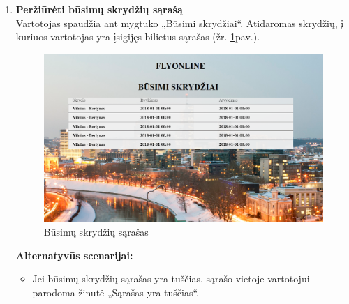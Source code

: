 \documentclass{VUMIFPSkursinis}
\begin{document}
\begin{enumerate}[label=\textbf{U\arabic*}.]
                    \item \textbf{Peržiūrėti būsimų skrydžių sąrašą}\\
                    Vartotojas spaudžia ant mygtuko „Būsimi skrydžiai“. Atidaromas skrydžių, į kuriuos vartotojas yra įsigijęs bilietus sąrašas (žr. \ref{upcoming}pav.).
                    \begin{figure}[H]	
                        \centering
                        \includegraphics[scale=0.6]{img/history}	
                        \caption{Būsimų skrydžių sąrašas}	
                        \label{upcoming}	
                    \end{figure}
                    \newpage\textbf{Alternatyvūs scenarijai:}
                    \begin{itemize}
                        \item Jei būsimų skrydžių sąrašas yra tuščias, sąrašo vietoje vartotojui parodoma žinutė „Sąrašas yra tuščias“.
                    \end{itemize}


\end{enumerate}
\end{document}
